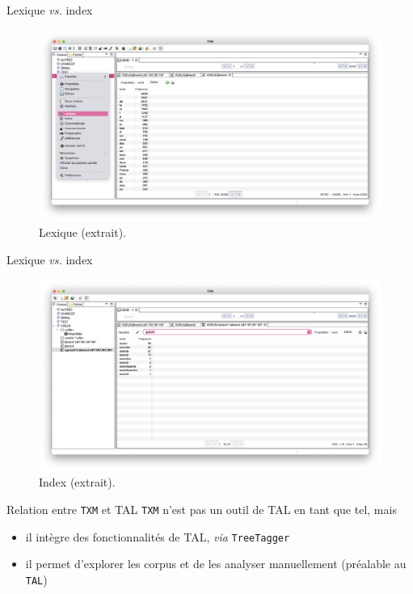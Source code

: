 \documentclass[xetex,xcolor={table,usenames,dvipsnames}]{beamer}
\begin{document}
\begin{frame}{Lexique \textit{vs.} index}
		\begin{figure}[h] %
		\centering
		\includegraphics[width=1\linewidth]{img/lexique.png}
		\caption{Lexique (extrait).}
		\label{fig:ling_out_TAL}
	\end{figure}
\end{frame}

\begin{frame}{Lexique \textit{vs.} index}
	\begin{figure}[h] %
		\centering
		\includegraphics[width=1\linewidth]{img/index.png}
		\caption{Index (extrait).}
		\label{fig:ling_out_TAL}
	\end{figure}
\end{frame}

\begin{frame}{Relation entre \texttt{TXM} et \textsc{TAL}}
	\texttt{TXM} n’est pas un outil de \textsc{TAL} en tant que tel, mais 
	\begin{itemize}
		\item il intègre des fonctionnalités de \textsc{TAL}, \textit{via} \texttt{TreeTagger}
		\item il permet d’explorer les corpus et de les analyser manuellement (préalable au \texttt{TAL})
	\end{itemize}
\end{frame}
\end{document}
